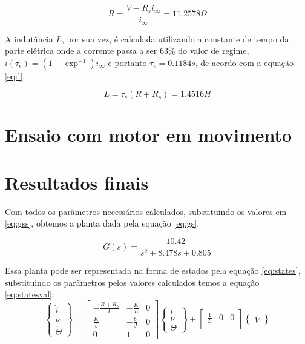 \documentclass{article}
\begin{document}
\begin{equation}
\label{eq:r}
R = \frac{V-R_si_\infty}{i_\infty}=11.2578\Omega
\end{equation}

A indutância $L$, por sua vez, é calculada utilizando a constante de tempo da parte elétrica onde a corrente passa a ser $63\%$ do valor de regime, $i(\tau_e)=(1-\exp^{-1})i_\infty$ e portanto
$\tau_e=0.1184s$, de acordo com a equação \ref{eq:l}.

\begin{equation}
\label{eq:l}
L = \tau_e(R+R_s)=1.4516H
\end{equation}

\section{Ensaio com motor em movimento}

\section{Resultados finais}
Com todos os parâmetros necessários calculados, substituindo os valores em \ref{eq:gss}, obtemos a planta dada pela equação \ref{eq:gs}.

\begin{equation}
\label{eq:gs}
G(s)=\frac{10.42}{s^2 + 8.478s + 0.805}
\end{equation}

Essa planta pode ser representada na forma de estados pela equação \ref{eq:states}, substituindo os parâmetros pelos valores calculados temos a equação \ref{eq:statesval}:
\begin{equation}
\label{eq:states}
\begin{Bmatrix}
\dot{i}\\ \dot{\nu} \\ \dot{\Theta} 
\end{Bmatrix} =
\begin{bmatrix}
-\frac{R+R_s}{L} & -\frac{K}{L} & 0\\
\frac{K}{b} & -\frac{b}{J} & 0\\
0 & 1 & 0
\end{bmatrix}
\begin{Bmatrix}
i\\ \nu \\ \Theta 
\end{Bmatrix} + 
\begin{bmatrix}
\frac{1}{L} & 0 & 0\\
\end{bmatrix}
\begin{Bmatrix}
V 
\end{Bmatrix}
\end{equation}
\end{document}
